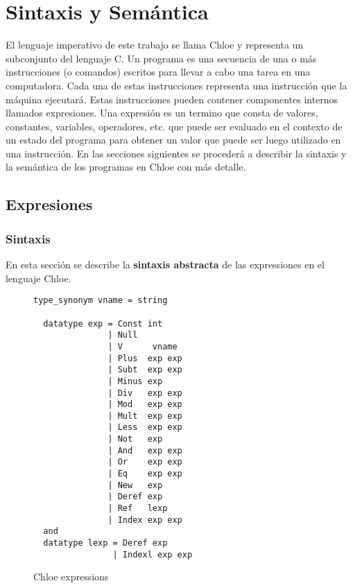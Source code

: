 \chapter{Sintaxis y Semántica}\label{chapter:semantics}

El lenguaje imperativo de este trabajo se llama Chloe y representa un subconjunto del lenguaje C.
Un programa es una secuencia de una o más instrucciones (o comandos) escritos para llevar a cabo una tarea en una computadora.
Cada una de estas instrucciones representa una instrucción que la máquina ejecutará.
Estas instrucciones pueden contener componentes internos llamados expresiones.
Una expresión es un termino que consta de valores, constantes, variables, operadores, etc. que puede ser evaluado en el contexto de un estado del programa para obtener un valor que puede ser luego utilizado en una instrucción.
En las secciones siguientes se procederá a describir la sintaxis y la semántica de los programas en Chloe con más detalle.


\section{Expresiones}\label{section:expressions}

\subsection{Sintaxis}\label{subsection:syntax_expressions}

En esta sección se describe la \textbf{sintaxis abstracta} de las expressiones en el lenguaje Chloe.

\begin{figure}
  \begin{lstlisting}[frame=single]
  type_synonym vname = string

  datatype exp = Const int
               | Null
               | V      vname
               | Plus  exp exp
               | Subt  exp exp
               | Minus exp
               | Div   exp exp
               | Mod   exp exp
               | Mult  exp exp
               | Less  exp exp
               | Not   exp
               | And   exp exp
               | Or    exp exp
               | Eq    exp exp
               | New   exp
               | Deref exp
               | Ref   lexp
               | Index exp exp
  and
  datatype lexp = Deref exp
                | Indexl exp exp
  \end{lstlisting}

  \caption{Chloe expressions}
  \label{fig:chloe_expressions}
\end{figure}

